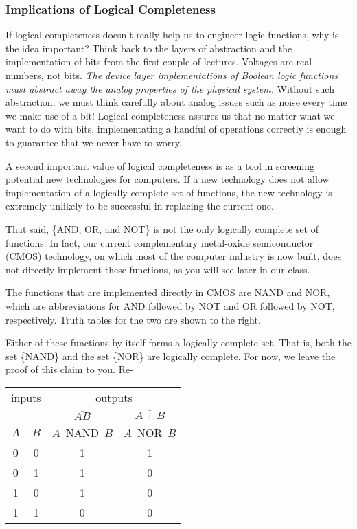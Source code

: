 \pagebreak

\subsubsection{Implications of Logical Completeness}

If logical completeness doesn't really help us to engineer logic functions,
why is the idea important?  Think back to the layers of abstraction
and the implementation of bits from the first couple of lectures.  
Voltages are real numbers, not bits.  {\em The device layer implementations
of Boolean logic functions must abstract away the analog properties
of the physical system.}  Without such abstraction, we must think
carefully about analog issues such as noise every time we make use
of a bit!
%
Logical completeness assures us that no matter what we want to do
with bits, implementating a handful of operations correctly is
enough to guarantee that we never have to worry.

A second important value of logical completeness is as a tool in
screening potential new technologies for computers.  If a new technology
does not allow implementation of a logically complete set of functions,
the new technology is extremely unlikely
to be successful in replacing the current one.

That said, \{AND, OR, and NOT\} is not the only logically complete set of
functions.  In fact, our current complementary metal-oxide semiconductor
(CMOS) technology, on which most of the computer industry is now built,
does not directly implement these functions, as you will see later in
our class.


\begin{minipage}{4in}
The functions that are implemented directly in CMOS are NAND and NOR, which
are abbreviations for AND followed by NOT and OR followed by NOT, 
respectively.  Truth tables for the two are shown to the right.\mpline

Either of these functions by itself forms a logically complete set.
That is, both the set \{NAND\} and the set \{NOR\} are logically
complete.  For now, we leave the proof of this claim to you.  Re-\linebreak
\end{minipage}\hspace{.25in}%
\begin{minipage}{2.25in}
\begin{tabular}{cc|cc}
\multicolumn{2}{c|}{inputs}& \multicolumn{2}{c}{outputs}\\
& & $\overline{AB}$& $\overline{A+B}$\\
$A$& $B$& $A$~NAND~$B$& $A$~NOR~$B$\\ \hline
0& 0& 1& 1\\
0& 1& 1& 0\\
1& 0& 1& 0\\
1& 1& 0& 0\\
\end{tabular}\vspace{12pt}
\end{minipage}\mpdone


